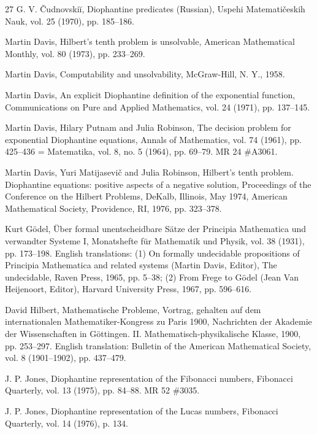\documentclass[11pt,a4paper]{article}
\newcommand{\origpage}[1]{\marginnote{\footnotesize\textbf{[#1]}}}
\begin{document}
\begin{thebibliography}{27}
 G. V. Čudnovskiĭ, Diophantine predicates (Russian), Uspehi Matematičeskih Nauk, vol. 25 (1970), pp. 185--186.

 Martin Davis, Hilbert's tenth problem is unsolvable, American Mathematical Monthly, vol. 80 (1973), pp. 233--269.

 Martin Davis, Computability and unsolvability, McGraw-Hill, N. Y., 1958.

 Martin Davis, An explicit Diophantine definition of the exponential function, Communications on Pure and Applied Mathematics, vol. 24 (1971), pp. 137--145.

 \origpage{350}Martin Davis, Hilary Putnam and Julia Robinson, The decision problem for exponential Diophantine equations, Annals of Mathematics, vol. 74 (1961), pp. 425--436 = Matematika, vol. 8, no. 5 (1964), pp. 69--79. MR 24 \#A3061.

 Martin Davis, Yuri Matijasevič and Julia Robinson, Hilbert's tenth problem. Diophantine equations: positive aspects of a negative solution, Proceedings of the Conference on the Hilbert Problems, DeKalb, Illinois, May 1974, American Mathematical Society, Providence, RI, 1976, pp. 323--378.

 Kurt Gödel, Über formal unentscheidbare Sätze der Principia Mathematica und verwandter Systeme I, Monatshefte für Mathematik und Physik, vol. 38 (1931), pp. 173--198. English translations: (1) On formally undecidable propositions of Principia Mathematica and related systems (Martin Davis, Editor), The undecidable, Raven Press, 1965, pp. 5--38; (2) From Frege to Gödel (Jean Van Heijenoort, Editor), Harvard University Press, 1967, pp. 596--616.

 David Hilbert, Mathematische Probleme, Vortrag, gehalten auf dem internationalen Mathematiker-Kongress zu Paris 1900, Nachrichten der Akademie der Wissenschaften in Göttingen. II. Mathematisch-physikalische Klasse, 1900, pp. 253--297. English translation: Bulletin of the American Mathematical Society, vol. 8 (1901--1902), pp. 437--479.

 J. P. Jones, Diophantine representation of the Fibonacci numbers, Fibonacci Quarterly, vol. 13 (1975), pp. 84--88. MR 52 \#3035.

 J. P. Jones, Diophantine representation of the Lucas numbers, Fibonacci Quarterly, vol. 14 (1976), p. 134.


\end{thebibliography}
\end{document}
